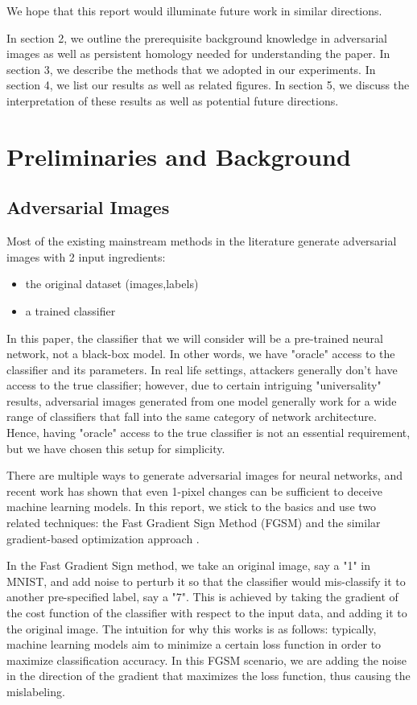 \documentclass[twoside,twocolumn]{article}
\begin{document}
We hope that this report would illuminate future work in similar directions. 

In section 2, we outline the prerequisite background knowledge in adversarial images as well as persistent homology needed for understanding the paper. In section 3, we describe the methods that we adopted in our experiments. In section 4, we list our results as well as related figures. In section 5, we discuss the interpretation of these results as well as potential future directions. 


\section{Preliminaries and Background}

\subsection{Adversarial Images}

Most of the existing mainstream methods in the literature generate adversarial images with 2 input ingredients: 
\begin{itemize}
    \item the original dataset (images,labels)
    \item a trained classifier
\end{itemize}
In this paper, the classifier that we will consider will be a pre-trained neural network, not a black-box model. In other words, we have "oracle" access to the classifier and its parameters. In real life settings, attackers generally don't have access to the true classifier; however, due to certain intriguing "universality" results, adversarial images generated from one model generally work for a wide range of classifiers that fall into the same category of network architecture. Hence, having "oracle" access to the true classifier is not an essential requirement, but we have chosen this setup for simplicity. 

There are multiple ways to generate adversarial images for neural networks, and recent work has shown that even 1-pixel changes can be sufficient to deceive machine learning models. In this report, we stick to the basics and use two related techniques: the Fast Gradient Sign Method (FGSM) \cite{goodfellow2014} and the similar gradient-based optimization approach \cite{szegedy2013}.

In the Fast Gradient Sign method, we take an original image, say a "1" in MNIST, and add noise to perturb it so that the classifier would mis-classify it to another pre-specified label, say a "7". This is achieved by taking the gradient of the cost function of the classifier with respect to the input data, and adding it to the original image. The intuition for why this works is as follows: typically, machine learning models aim to minimize a certain loss function in order to maximize classification accuracy. In this FGSM scenario, we are adding the noise in the direction of the gradient that maximizes the loss function, thus causing the mislabeling. 
\end{document}
